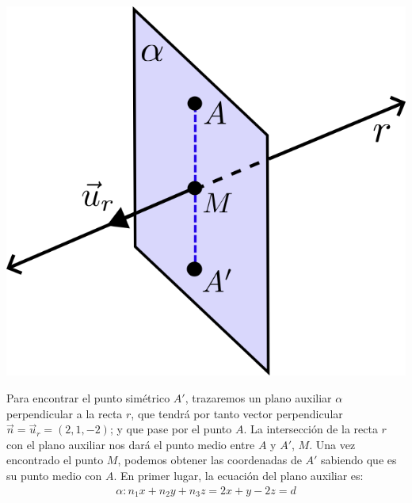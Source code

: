 \begin{enumerate}
    \begin{minipage}{.4\textwidth}
        \includegraphics[scale=0.3]{b3_c.png}
    \end{minipage}
    \begin{minipage}{.54\textwidth}
        Para encontrar el punto simétrico $A'$, trazaremos un plano auxiliar $\alpha $ perpendicular a la recta $r$, que tendrá por tanto vector perpendicular $\vec{n}=\vec{u}_r=(2,1,-2)$; y que pase por el punto $A$. La intersección de la recta $r$ con el plano auxiliar nos dará el punto medio entre $A$ y $A'$, $M$. Una vez encontrado el punto $M$, podemos obtener las coordenadas de $A'$ sabiendo que es su punto medio con $A$. En primer lugar, la ecuación del plano auxiliar es:
        \begin{equation*}
            \begin{split}
                \alpha : n_1 x+ n_2 y+n_3 z =2x+y-2z=d
            \end{split}
        \end{equation*}
    \end{minipage}
    

\end{enumerate}
